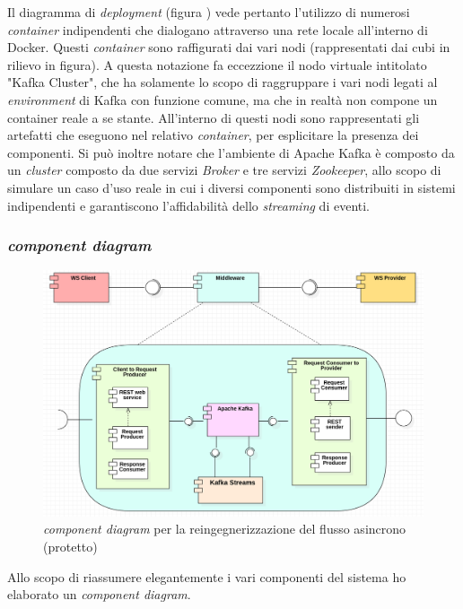 Il diagramma di \textit{deployment} (figura \thefigure) vede pertanto l'utilizzo di numerosi \textit{container} indipendenti che dialogano attraverso una rete locale all'interno di Docker.
Questi \textit{container} sono raffigurati dai vari nodi (rappresentati dai cubi in rilievo in figura).
A questa notazione fa eccezzione il nodo virtuale intitolato "Kafka Cluster", che ha solamente lo scopo di raggruppare i vari nodi legati al \textit{environment} di Kafka con funzione comune, ma che in realtà non compone un container reale a se stante.
All'interno di questi nodi sono rappresentati gli artefatti che eseguono nel relativo \textit{container}, per esplicitare la presenza dei componenti.
Si può inoltre notare che l'ambiente di Apache Kafka è composto da un \textit{cluster} composto da due servizi \textit{Broker} e tre servizi \textit{Zookeeper}, allo scopo di simulare un caso d'uso reale in cui i diversi componenti sono distribuiti in sistemi indipendenti e garantiscono l'affidabilità dello \textit{streaming} di eventi.

\subsubsection{ \textit{component diagram}}

\begin{figure}[h]
  \begin{center}
    \includegraphics[width=\textwidth]{images/ap_component.png}
    \caption{ \textit{component diagram} per la reingegnerizzazione del flusso asincrono (protetto)}
  \end{center}
\end{figure}

Allo scopo di riassumere elegantemente i vari componenti del sistema ho elaborato un  \textit{component diagram}.


